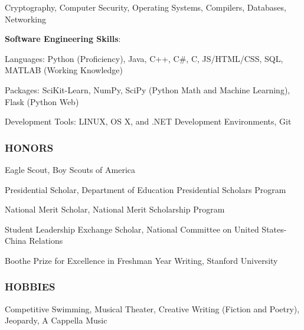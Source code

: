 \documentclass[11pt,letterpaper]{article}%
\begin{document}
\hspace{2.4em}
Cryptography, 
Computer Security,
Operating Systems,
Compilers,
Databases,
Networking


\hspace{.6em}
{\bf Software Engineering Skills}:

\hspace{2.4em} 
Languages: Python (Proficiency), Java, C++, C\#, C, JS/HTML/CSS, SQL, MATLAB (Working Knowledge)

\hspace{2.4em} 
Packages: SciKit-Learn, NumPy, SciPy (Python Math and Machine Learning), Flask (Python Web)

\hspace{2.4em} Development Tools: LINUX, OS X, and .NET Development Environments, Git

\vspace{-.5em}
\hrulefill 
\subsubsection*{HONORS}
\vspace{-1ex}
\hrulefill
\vspace{-1.5ex}

\begin{itemize*}
\item Eagle Scout, Boy Scouts of America
\item Presidential Scholar, Department of Education Presidential Scholars Program
\item National Merit Scholar, National Merit Scholarship Program
\item Student Leadership Exchange Scholar, National Committee on United States-China Relations
\item Boothe Prize for Excellence in Freshman Year Writing, Stanford University
\end{itemize*}

\vspace{-1em}
\hrulefill 
\subsubsection*{HOBBIES}
\vspace{-1ex}
\hrulefill

\hspace{.6em}
Competitive Swimming, Musical Theater, Creative Writing (Fiction and Poetry), Jeopardy, A Cappella Music

\vspace{-.6em}
\end{document}
